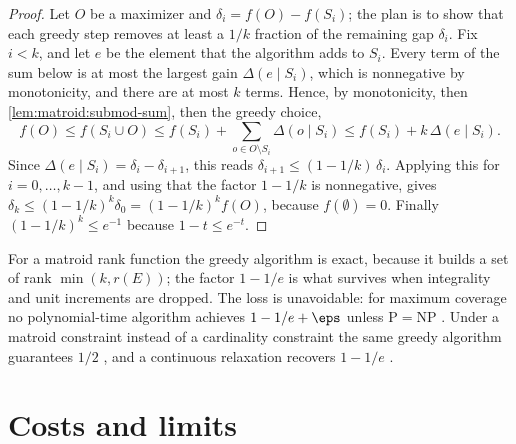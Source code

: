 \begin{refsection}
\begin{proof}
Let $O$ be a maximizer and $\delta_i=f(O)-f(S_i)$; the plan is to show that each greedy step removes at least a $1/k$ fraction of the remaining gap $\delta_i$. Fix $i<k$, and let $e$ be the element that the algorithm adds to $S_i$. Every term of the sum below is at most the largest gain $\Delta(e\mid S_i)$, which is nonnegative by monotonicity, and there are at most $k$ terms. Hence, by monotonicity, then \cref{lem:matroid:submod-sum}, then the greedy choice,
\[
f(O)\le f(S_i\cup O)\le f(S_i)+\sum_{o\in O\setminus S_i}\Delta(o\mid S_i)\le f(S_i)+k\,\Delta(e\mid S_i).
\]
Since $\Delta(e\mid S_i)=\delta_i-\delta_{i+1}$, this reads $\delta_{i+1}\le(1-1/k)\,\delta_i$. Applying this for $i=0,\dots,k-1$, and using that the factor $1-1/k$ is nonnegative, gives $\delta_k\le(1-1/k)^k\delta_0=(1-1/k)^kf(O)$, because $f(\emptyset)=0$. Finally $(1-1/k)^k\le e^{-1}$ because $1-t\le e^{-t}$.
\end{proof}

For a matroid rank function the greedy algorithm is exact, because it builds a set of rank $\min(k,r(E))$; the factor $1-1/e$ is what survives when integrality and unit increments are dropped. The loss is unavoidable: for maximum coverage no polynomial-time algorithm achieves $1-1/e+\eps$ unless $\mathrm{P}=\mathrm{NP}$ \parencite{Feige1998}. Under a matroid constraint instead of a cardinality constraint the same greedy algorithm guarantees $1/2$ \parencite{FisherNemhauserWolsey1978}, and a continuous relaxation recovers $1-1/e$ \parencite{CalinescuChekuriPalVondrak2011}.

\section{Costs and limits}\label{sec:matroid:costs}


\end{refsection}
